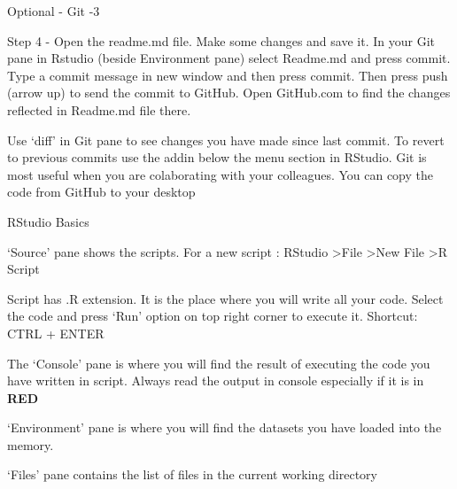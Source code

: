 \documentclass[ignorenonframetext,]{beamer}
\begin{document}
\begin{frame}{Optional - Git -3}
\protect\hypertarget{optional---git--3}{}

Step 4 - Open the readme.md file. Make some changes and save it. In your
Git pane in Rstudio (beside Environment pane) select Readme.md and press
commit. Type a commit message in new window and then press commit. Then
press push (arrow up) to send the commit to GitHub. Open GitHub.com to
find the changes reflected in Readme.md file there.

Use `diff' in Git pane to see changes you have made since last commit.
To revert to previous commits use the addin below the menu section in
RStudio. Git is most useful when you are colaborating with your
colleagues. You can copy the code from GitHub to your desktop

\end{frame}

\begin{frame}{RStudio Basics}
\protect\hypertarget{rstudio-basics}{}

`Source' pane shows the scripts. For a new script : RStudio
\textgreater{}File \textgreater{}New File \textgreater{}R Script

Script has .R extension. It is the place where you will write all your
code. Select the code and press `Run' option on top right corner to
execute it. Shortcut: CTRL + ENTER

The `Console' pane is where you will find the result of executing the
code you have written in script. Always read the output in console
especially if it is in \textbf{RED}

`Environment' pane is where you will find the datasets you have loaded
into the memory.

`Files' pane contains the list of files in the current working directory

\end{frame}
\end{document}
